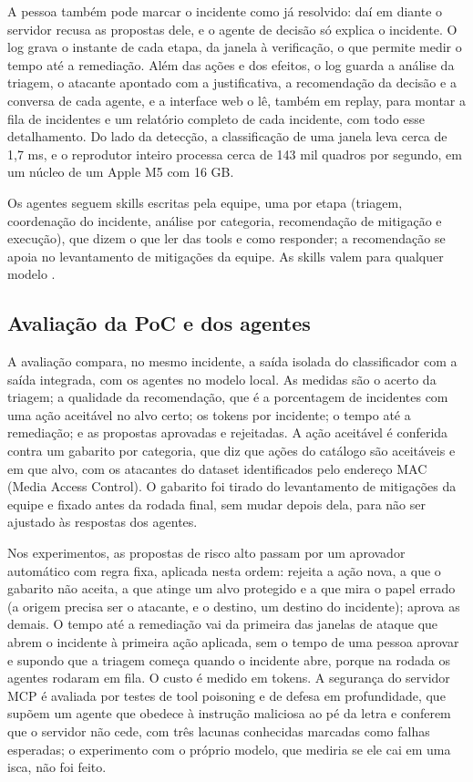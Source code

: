 A pessoa também pode marcar o incidente como já resolvido: daí em diante o servidor recusa as propostas dele, e o agente de decisão só explica o incidente. O log grava o instante de cada etapa, da janela à verificação, o que permite medir o tempo até a remediação. Além das ações e dos efeitos, o log guarda a análise da triagem, o atacante apontado com a justificativa, a recomendação da decisão e a conversa de cada agente, e a interface web o lê, também em replay, para montar a fila de incidentes e um relatório completo de cada incidente, com todo esse detalhamento. Do lado da detecção, a classificação de uma janela leva cerca de 1,7 ms, e o reprodutor inteiro processa cerca de 143 mil quadros por segundo, em um núcleo de um Apple M5 com 16 GB.

Os agentes seguem skills escritas pela equipe, uma por etapa (triagem, coordenação do incidente, análise por categoria, recomendação de mitigação e execução), que dizem o que ler das tools e como responder; a recomendação se apoia no levantamento de mitigações da equipe. As skills valem para qualquer modelo \cite{oliveira2026}.

\subsection{Avaliação da PoC e dos agentes}
\label{sec:avaliacao}

A avaliação compara, no mesmo incidente, a saída isolada do classificador com a saída integrada, com os agentes no modelo local. As medidas são o acerto da triagem; a qualidade da recomendação, que é a porcentagem de incidentes com uma ação aceitável no alvo certo; os tokens por incidente; o tempo até a remediação; e as propostas aprovadas e rejeitadas. A ação aceitável é conferida contra um gabarito por categoria, que diz que ações do catálogo são aceitáveis e em que alvo, com os atacantes do dataset identificados pelo endereço MAC (Media Access Control). O gabarito foi tirado do levantamento de mitigações da equipe e fixado antes da rodada final, sem mudar depois dela, para não ser ajustado às respostas dos agentes.

Nos experimentos, as propostas de risco alto passam por um aprovador automático com regra fixa, aplicada nesta ordem: rejeita a ação nova, a que o gabarito não aceita, a que atinge um alvo protegido e a que mira o papel errado (a origem precisa ser o atacante, e o destino, um destino do incidente); aprova as demais. O tempo até a remediação vai da primeira das janelas de ataque que abrem o incidente à primeira ação aplicada, sem o tempo de uma pessoa aprovar e supondo que a triagem começa quando o incidente abre, porque na rodada os agentes rodaram em fila. O custo é medido em tokens. A segurança do servidor MCP é avaliada por testes de tool poisoning e de defesa em profundidade, que supõem um agente que obedece à instrução maliciosa ao pé da letra e conferem que o servidor não cede, com três lacunas conhecidas marcadas como falhas esperadas; o experimento com o próprio modelo, que mediria se ele cai em uma isca, não foi feito.

